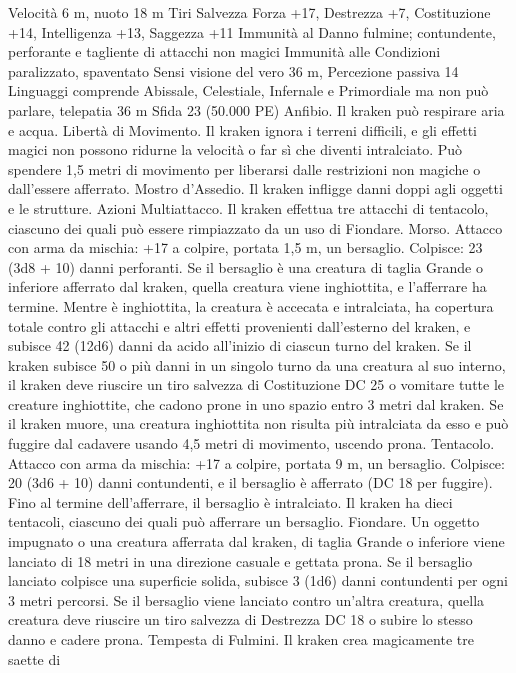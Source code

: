\begin{multicols}{2}
Velocità 6 m, nuoto 18 m
Tiri Salvezza Forza +17, Destrezza +7, Costituzione +14,
Intelligenza +13, Saggezza +11
Immunità al Danno fulmine; contundente, perforante e tagliente
di attacchi non magici
Immunità alle Condizioni paralizzato, spaventato
Sensi visione del vero 36 m, Percezione passiva 14
Linguaggi comprende Abissale, Celestiale, Infernale e
Primordiale ma non può parlare, telepatia 36 m
Sfida 23 (50.000 PE)
Anfibio. Il kraken può respirare aria e acqua.
Libertà di Movimento. Il kraken ignora i terreni difficili, e gli
effetti magici non possono ridurne la velocità o far sì che diventi
intralciato. Può spendere 1,5 metri di movimento per liberarsi
dalle restrizioni non magiche o dall’essere afferrato.
Mostro d’Assedio. Il kraken infligge danni doppi agli oggetti e le
strutture.
Azioni
Multiattacco. Il kraken effettua tre attacchi di tentacolo, ciascuno
dei quali può essere rimpiazzato da un uso di Fiondare.
Morso. Attacco con arma da mischia: +17 a colpire, portata 1,5
m, un bersaglio.
Colpisce: 23 (3d8 + 10) danni perforanti. Se il bersaglio è una
creatura di taglia Grande o inferiore afferrato dal kraken, quella
creatura viene inghiottita, e l’afferrare ha termine. Mentre è
inghiottita, la creatura è accecata e intralciata, ha copertura totale
contro gli attacchi e altri effetti provenienti dall’esterno del
kraken, e subisce 42 (12d6) danni da acido all’inizio di ciascun
turno del kraken.
Se il kraken subisce 50 o più danni in un singolo turno da una
creatura al suo interno, il kraken deve riuscire un tiro salvezza di
Costituzione DC 25 o vomitare tutte le creature inghiottite, che
cadono prone in uno spazio entro 3 metri dal kraken. Se il kraken
muore, una creatura inghiottita non risulta più intralciata da esso
e può fuggire dal cadavere usando 4,5 metri di movimento,
uscendo prona.
Tentacolo. Attacco con arma da mischia: +17 a colpire, portata 9
m, un bersaglio.
Colpisce: 20 (3d6 + 10) danni contundenti, e il bersaglio è
afferrato (DC 18 per fuggire). Fino al termine dell’afferrare, il
bersaglio è intralciato. Il kraken ha dieci tentacoli, ciascuno dei
quali può afferrare un bersaglio.
Fiondare. Un oggetto impugnato o una creatura afferrata dal
kraken, di taglia Grande o inferiore viene lanciato di 18 metri in
una direzione casuale e gettata prona. Se il bersaglio lanciato
colpisce una superficie solida, subisce 3 (1d6) danni contundenti
per ogni 3 metri percorsi. Se il bersaglio viene lanciato contro
un’altra creatura, quella creatura deve riuscire un tiro salvezza di
Destrezza DC 18 o subire lo stesso danno e cadere prona.
Tempesta di Fulmini. Il kraken crea magicamente tre saette di

\end{multicols}
